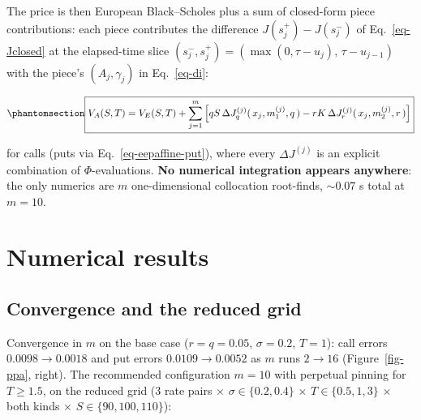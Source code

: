 \documentclass[
  english,
  10pt,
  letterpaper,
  DIV=11,
  numbers=noendperiod]{scrartcl}
\begin{document}
The price is then European Black--Scholes plus a sum of closed-form
piece contributions: each piece contributes the difference
\(J(s_j^+)-J(s_j^-)\) of Eq.~\ref{eq-Jclosed} at the elapsed-time slice
\((s_j^-,s_j^+)=(\max(0,\tau-u_j),\,\tau-u_{j-1})\) with the piece's
\((A_j,\gamma_j)\) in Eq.~\ref{eq-di}:

\begin{equation}\protect\phantomsection\label{eq-ppa}{
\boxed{
V_A(S,T)=V_E(S,T)+\sum_{j=1}^{m}\Big[
qS\,\Delta J^{(j)}_{q}(\,x_j,m_1^{(j)},q\,)
-rK\,\Delta J^{(j)}_{r}(\,x_j,m_2^{(j)},r\,)\Big]
}
}\end{equation}

for calls (puts via Eq.~\ref{eq-eepaffine-put}), where every
\(\Delta J^{(j)}\) is an explicit combination of \(\Phi\)-evaluations.
\textbf{No numerical integration appears anywhere}: the only numerics
are \(m\) one-dimensional collocation root-finds, \(\sim0.07\) s total
at \(m=10\).

\section{Numerical results}\label{sec-results}

\subsection{Convergence and the reduced
grid}\label{convergence-and-the-reduced-grid}

Convergence in \(m\) on the base case (\(r=q=0.05\), \(\sigma=0.2\),
\(T=1\)): call errors \(0.0098\to0.0018\) and put errors
\(0.0109\to0.0052\) as \(m\) runs \(2\to16\) (Figure~\ref{fig-ppa},
right). The recommended configuration \(m=10\) with perpetual pinning
for \(T\ge1.5\), on the reduced grid (3 rate pairs \(\times\)
\(\sigma\in\{0.2,0.4\}\) \(\times\) \(T\in\{0.5,1,3\}\) \(\times\) both
kinds \(\times\) \(S\in\{90,100,110\}\)):
\end{document}
